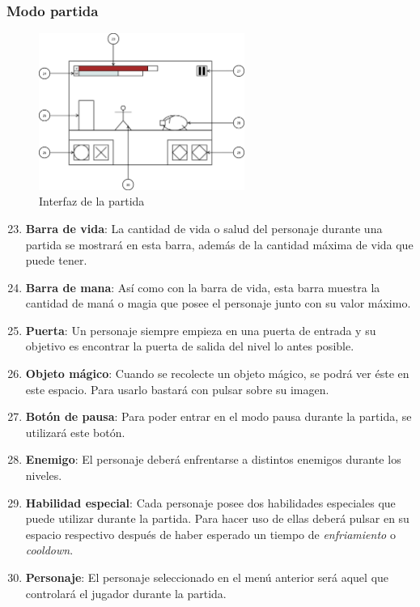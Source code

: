 \subsubsection{Modo partida}
\begin{figure}[H]
    \centering
    \includegraphics[width=0.6\textwidth]{5-Cuerpo/Chapter5/I6.png} %
    \caption{Interfaz de la partida}
    \label{fig:Interface_Partida}
\end{figure}
\begin{enumerate}\setcounter{enumi}{22}
    \item \textbf{Barra de vida}: La cantidad de vida o salud del personaje
    durante una partida se mostrará en esta barra, además de la cantidad máxima
    de vida que puede tener.
    \item \textbf{Barra de mana}: Así como con la barra de vida, esta barra
    muestra la cantidad de maná o magia que posee el personaje junto con su
    valor máximo.
    \item \textbf{Puerta}: Un personaje siempre empieza en una puerta
    de entrada y su objetivo es encontrar la puerta de salida del nivel lo antes
    posible.
    \item \textbf{Objeto mágico}: Cuando se recolecte un objeto mágico, se podrá
    ver éste en este espacio. Para usarlo bastará con pulsar sobre su imagen.
    \item \textbf{Botón de pausa}: Para poder entrar en el modo pausa durante la
    partida, se utilizará este botón.
    \item \textbf{Enemigo}: El personaje deberá enfrentarse a distintos enemigos
    durante los niveles.
    \item \textbf{Habilidad especial}: Cada personaje posee dos habilidades
    especiales que puede utilizar durante la partida. Para hacer uso de ellas
    deberá pulsar en su espacio respectivo después de haber esperado un tiempo
    de \emph{enfriamiento} o \emph{cooldown}.
    \item \textbf{Personaje}: El personaje seleccionado en el menú anterior será
    aquel que controlará el jugador durante la partida.
\end{enumerate}

